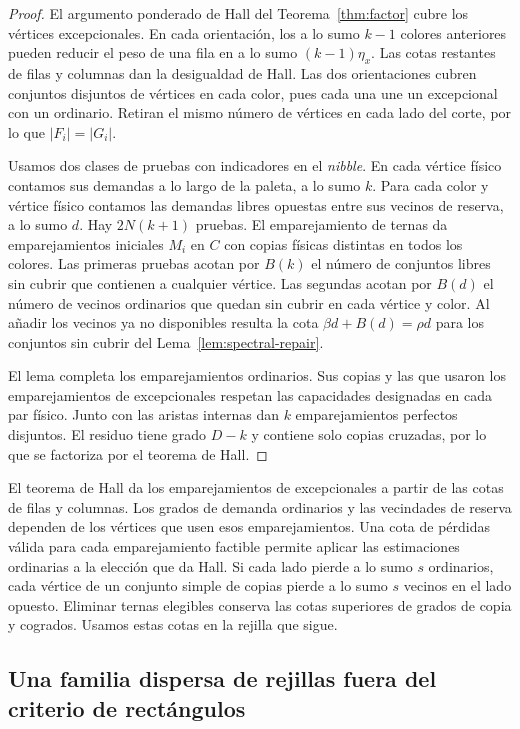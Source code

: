 \begin{proof}
El argumento ponderado de Hall del Teorema~\ref{thm:factor} cubre los vértices excepcionales. En cada orientación, los a lo sumo \(k-1\) colores anteriores pueden reducir el peso de una fila en a lo sumo \((k-1)\eta_x\). Las cotas restantes de filas y columnas dan la desigualdad de Hall. Las dos orientaciones cubren conjuntos disjuntos de vértices en cada color, pues cada una une un excepcional con un ordinario. Retiran el mismo número de vértices en cada lado del corte, por lo que \(|F_i|=|G_i|\).

Usamos dos clases de pruebas con indicadores en el \emph{nibble}. En cada vértice físico contamos sus demandas a lo largo de la paleta, a lo sumo \(k\). Para cada color y vértice físico contamos las demandas libres opuestas entre sus vecinos de reserva, a lo sumo \(d\). Hay \(2N(k+1)\) pruebas. El emparejamiento de ternas da emparejamientos iniciales \(M_i\) en \(C\) con copias físicas distintas en todos los colores. Las primeras pruebas acotan por \(B(k)\) el número de conjuntos libres sin cubrir que contienen a cualquier vértice. Las segundas acotan por \(B(d)\) el número de vecinos ordinarios que quedan sin cubrir en cada vértice y color. Al añadir los vecinos ya no disponibles resulta la cota \(\beta d+B(d)=\rho d\) para los conjuntos sin cubrir del Lema~\ref{lem:spectral-repair}.

El lema completa los emparejamientos ordinarios. Sus copias y las que usaron los emparejamientos de excepcionales respetan las capacidades designadas en cada par físico. Junto con las aristas internas dan \(k\) emparejamientos perfectos disjuntos. El residuo tiene grado \(D-k\) y contiene solo copias cruzadas, por lo que se factoriza por el teorema de Hall.
\end{proof}

El teorema de Hall da los emparejamientos de excepcionales a partir de las cotas de filas y columnas. Los grados de demanda ordinarios y las vecindades de reserva dependen de los vértices que usen esos emparejamientos. Una cota de pérdidas válida para cada emparejamiento factible permite aplicar las estimaciones ordinarias a la elección que da Hall. Si cada lado pierde a lo sumo \(s\) ordinarios, cada vértice de un conjunto simple de copias pierde a lo sumo \(s\) vecinos en el lado opuesto. Eliminar ternas elegibles conserva las cotas superiores de grados de copia y cogrados. Usamos estas cotas en la rejilla que sigue.

\subsection{Una familia dispersa de rejillas fuera del criterio de rectángulos}\label{sec:sparse-reserve-example}

